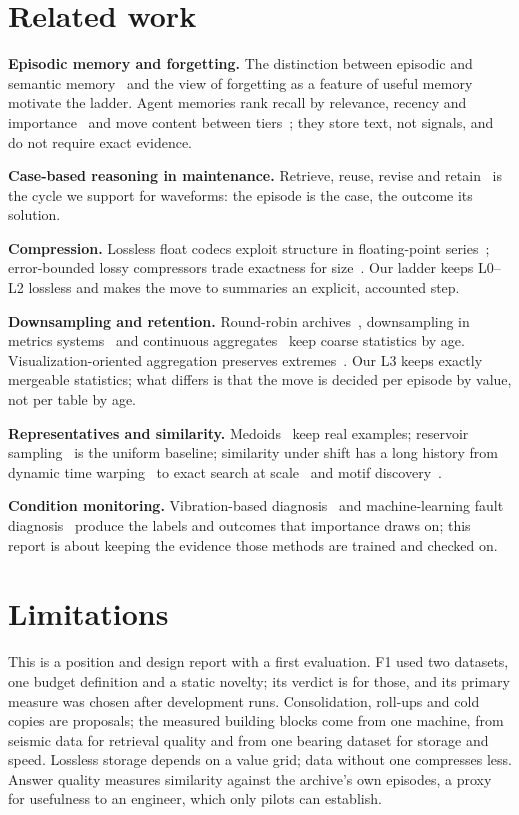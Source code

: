 \documentclass[sigconf,nonacm]{acmart}
\begin{document}
\section{Related work}\label{sec:related}
\textbf{Episodic memory and forgetting.} The distinction between episodic and semantic memory~\cite{tulving1972} and the view of forgetting as a feature of useful memory~\cite{richards2017} motivate the ladder. Agent memories rank recall by relevance, recency and importance~\cite{park2023generative} and move content between tiers~\cite{packer2023memgpt}; they store text, not signals, and do not require exact evidence.

\textbf{Case-based reasoning in maintenance.} Retrieve, reuse, revise and retain~\cite{aamodt1994} is the cycle we support for waveforms: the episode is the case, the outcome its solution.

\textbf{Compression.} Lossless float codecs exploit structure in floating-point series~\cite{pelkonen2015gorilla,liakos2022chimp,afroozeh2023alp}; error-bounded lossy compressors trade exactness for size~\cite{di2016sz,lindstrom2014zfp}. Our ladder keeps L0--L2 lossless and makes the move to summaries an explicit, accounted step.

\textbf{Downsampling and retention.} Round-robin archives~\cite{rrdtool_rrdcreate}, downsampling in metrics systems~\cite{thanos_compactor} and continuous aggregates~\cite{timescale_caggs} keep coarse statistics by age. Visualization-oriented aggregation preserves extremes~\cite{jugel2014m4}. Our L3 keeps exactly mergeable statistics; what differs is that the move is decided per episode by value, not per table by age.

\textbf{Representatives and similarity.} Medoids~\cite{kaufman1990} keep real examples; reservoir sampling~\cite{vitter1985} is the uniform baseline; similarity under shift has a long history from dynamic time warping~\cite{sakoe1978} to exact search at scale~\cite{rakthanmanon2012} and motif discovery~\cite{yeh2016matrixprofile}.

\textbf{Condition monitoring.} Vibration-based diagnosis~\cite{randall2011} and machine-learning fault diagnosis~\cite{lei2020} produce the labels and outcomes that importance draws on; this report is about keeping the evidence those methods are trained and checked on.

\section{Limitations}
This is a position and design report with a first evaluation. F1 used two datasets, one budget definition and a static novelty; its verdict is for those, and its primary measure was chosen after development runs. Consolidation, roll-ups and cold copies are proposals; the measured building blocks come from one machine, from seismic data for retrieval quality and from one bearing dataset for storage and speed. Lossless storage depends on a value grid; data without one compresses less. Answer quality measures similarity against the archive's own episodes, a proxy for usefulness to an engineer, which only pilots can establish.
\end{document}
